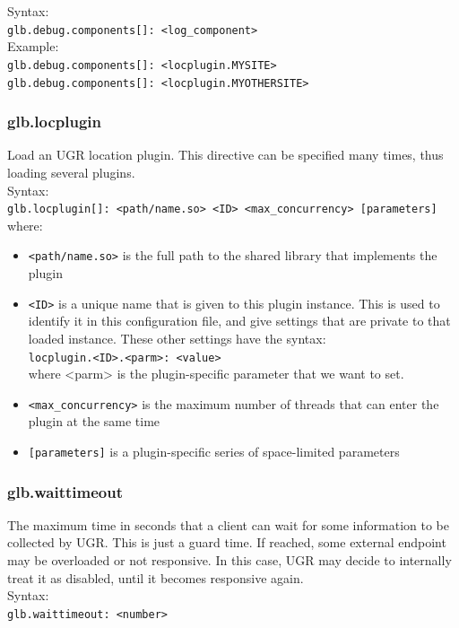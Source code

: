 \documentclass[12pt]{article} %
\begin{document}
 Syntax:\\

\lstinline"glb.debug.components[]: <log_component>"\\

 Example:\\
\lstinline"glb.debug.components[]: <locplugin.MYSITE>"\\
\lstinline"glb.debug.components[]: <locplugin.MYOTHERSITE>"\\

\subsubsection{\label{glb.locplugin}glb.locplugin}

 Load an UGR location plugin. This directive can be specified many times, thus loading several plugins.\\
 
 Syntax:\\

\lstinline"glb.locplugin[]: <path/name.so> <ID> <max_concurrency> [parameters]"\\

where:

\begin{itemize}
\item \lstinline"<path/name.so>" is the full path to the shared library that implements the plugin
\item \lstinline"<ID>" is a unique name that is given to this plugin instance. This is used to identify it in this configuration file, and give settings that are private to that loaded instance. These other settings have the syntax:\\
      \lstinline"locplugin.<ID>.<parm>: <value>"\\
     where <parm> is the plugin-specific parameter that we want to set.
\item \lstinline"<max_concurrency>" is the maximum number of threads that can enter the plugin at the same time
\item \lstinline"[parameters]" is a plugin-specific series of space-limited parameters
\end{itemize}


\subsubsection{glb.waittimeout}

The maximum time in seconds that a client can wait for some information to be collected by UGR. This is just a guard time. If reached, some external endpoint may be overloaded or not responsive. In this case, UGR may decide to internally treat it as disabled, until it becomes responsive again.
\\
Syntax:\\
\lstinline"glb.waittimeout: <number>"
\end{document}
